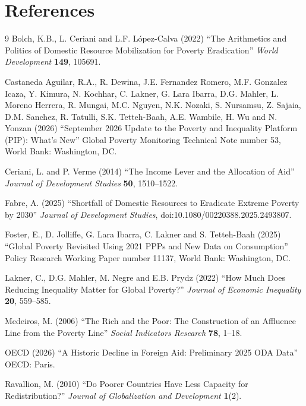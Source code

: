 \documentclass[12pt,english]{article}
\begin{document}
\thispagestyle{empty}



\section*{\centering References}
\begin{thebibliography}{9}
\setlength{\itemsep}{0pt}
Bolch, K.B., L. Ceriani and L.F. L\'opez-Calva (2022) ``The Arithmetics and Politics of Domestic Resource Mobilization for Poverty Eradication'' \textit{World Development} \textbf{149}, 105691.

Castaneda Aguilar, R.A., R. Dewina, J.E. Fernandez Romero, M.F. Gonzalez Icaza, Y. Kimura, N. Kochhar, C. Lakner, G. Lara Ibarra, D.G. Mahler, L. Moreno Herrera, R. Mungai, M.C. Nguyen, N.K. Nozaki, S. Nursamsu, Z. Sajaia, D.M. Sanchez, R. Tatulli, S.K. Tetteh-Baah, A.E. Wambile, H. Wu and N. Yonzan (2026) ``September 2026 Update to the Poverty and Inequality Platform (PIP): What's New'' Global Poverty Monitoring Technical Note number 53, World Bank: Washington, DC.

Ceriani, L. and P. Verme (2014) ``The Income Lever and the Allocation of Aid'' \textit{Journal of Development Studies} \textbf{50}, 1510--1522.

Fabre, A. (2025) ``Shortfall of Domestic Resources to Eradicate Extreme Poverty by 2030'' \textit{Journal of Development Studies}, doi:10.1080/00220388.2025.2493807.

Foster, E., D. Jolliffe, G. Lara Ibarra, C. Lakner and S. Tetteh-Baah (2025) ``Global Poverty Revisited Using 2021 PPPs and New Data on Consumption'' Policy Research Working Paper number 11137, World Bank: Washington, DC.

Lakner, C., D.G. Mahler, M. Negre and E.B. Prydz (2022) ``How Much Does Reducing Inequality Matter for Global Poverty?'' \textit{Journal of Economic Inequality} \textbf{20}, 559--585.

Medeiros, M. (2006) ``The Rich and the Poor: The Construction of an Affluence Line from the Poverty Line'' \textit{Social Indicators Research} \textbf{78}, 1--18.

OECD (2026) ``A Historic Decline in Foreign Aid: Preliminary 2025 ODA Data'' OECD: Paris.

Ravallion, M. (2010) ``Do Poorer Countries Have Less Capacity for Redistribution?'' \textit{Journal of Globalization and Development} \textbf{1}(2).
\end{thebibliography}
\end{document}
